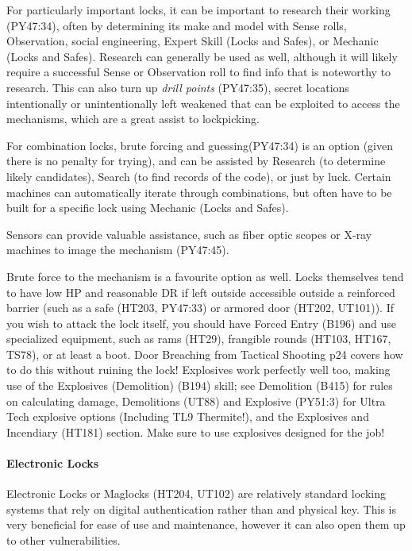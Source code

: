 \begin{multicols}{2}
	For particularly important locks, it can be important to research their working (PY47:34), often by determining its make and model with Sense rolls, Observation, social engineering, Expert Skill (Locks and Safes), or Mechanic (Locks and Safes). Research can generally be used as well, although it will likely require a successful Sense or Observation roll to find info that is noteworthy to research. This can also turn up \textit{drill points} (PY47:35), secret locations intentionally or unintentionally left weakened that can be exploited to access the mechanisms, which are a great assist to lockpicking.
	
	For combination locks, brute forcing and guessing(PY47:34) is an option (given there is no penalty for trying), and can be assisted by Research (to determine likely candidates), Search (to find records of the code), or just by luck. Certain machines can automatically iterate through combinations, but often have to be built for a specific lock using Mechanic (Locks and Safes).
	
	Sensors can provide valuable assistance, such as fiber optic scopes or X-ray machines to image the mechanism (PY47:45).
	
	Brute force to the mechanism is a favourite option as well. Locks themselves tend to have low HP and reasonable DR if left outside accessible outside a reinforced barrier (such as a safe (HT203, PY47:33) or armored door (HT202, UT101)). If you wish to attack the lock itself, you should have Forced Entry (B196) and use specialized equipment, such as rams (HT29), frangible rounds (HT103, HT167, TS78), or at least a boot. Door Breaching from Tactical Shooting p24 covers how to do this without ruining the lock! Explosives work perfectly well too, making use of the Explosives (Demolition) (B194) skill; see Demolition (B415) for rules on calculating damage, Demolitions (UT88) and Explosive (PY51:3) for Ultra Tech explosive options (Including TL9 Thermite!), and the Explosives and Incendiary (HT181) section. Make sure to use explosives designed for the job! 
	
	\paragraph{Electronic Locks}
	
	Electronic Locks or Maglocks (HT204, UT102) are relatively standard locking systems that rely on digital authentication rather than and physical key. This is very beneficial for ease of use and maintenance, however it can also open them up to other vulnerabilities.
	

\end{multicols}
